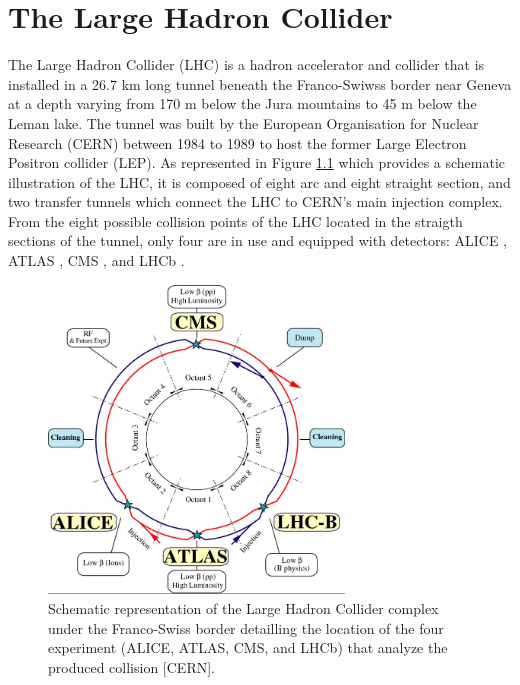 \chapter{The Large Hadron Collider}
\label{chap:I-2-lhc}

	The Large Hadron Collider (LHC) \cite{Evans:2008zzb} is a hadron accelerator and collider that is installed in a 26.7 km long tunnel beneath the Franco-Swiwss border near Geneva at a depth varying from 170 m below the Jura mountains to 45 m below the Leman lake. The tunnel was built by the European Organisation for Nuclear Research (CERN) between 1984 to 1989 to host the former Large Electron Positron collider (LEP). As represented in Figure \ref{fig:I-2-lhc-schematic} which provides a schematic illustration of the LHC, it is composed of eight arc and eight straight section, and two transfer tunnels which connect the LHC to CERN's main injection complex. From the eight possible collision points of the LHC located in the straigth sections of the tunnel, only four are in use and equipped with detectors: ALICE \cite{1748-0221-3-08-S08002}, ATLAS \cite{1748-0221-3-08-S08003}, CMS \cite{1748-0221-3-08-S08004}, and LHCb \cite{1748-0221-3-08-S08005}. \\

	\begin{figure}[h!]
		\centering
		\includegraphics[width=0.7\textwidth]{img/I-2-lhc/lhc.jpg}
		\caption{Schematic representation of the Large Hadron Collider complex under the Franco-Swiss border detailling the location of the four experiment (ALICE, ATLAS, CMS, and LHCb) that analyze the produced collision [CERN].}
		\label{fig:I-2-lhc-schematic}
	\end{figure}

